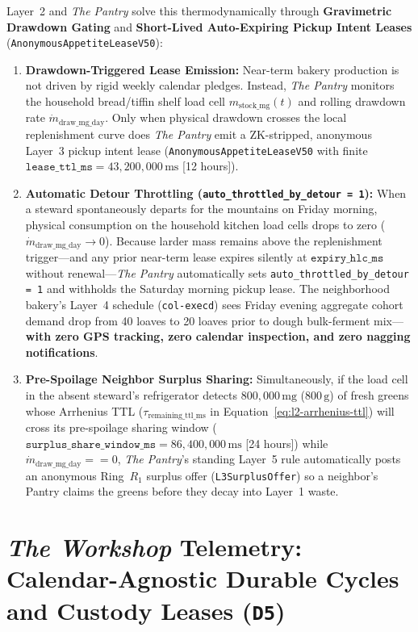 Layer~2 and \textit{The Pantry} solve this thermodynamically through \textbf{Gravimetric Drawdown Gating} and \textbf{Short-Lived Auto-Expiring Pickup Intent Leases} (\texttt{AnonymousAppetiteLeaseV50}):
\begin{enumerate}
    \item \textbf{Drawdown-Triggered Lease Emission:} Near-term bakery production is not driven by rigid weekly calendar pledges. Instead, \textit{The Pantry} monitors the household bread/tiffin shelf load cell $m_{\mathrm{stock\_mg}}(t)$ and rolling drawdown rate $\dot{m}_{\mathrm{draw\_mg\_day}}$. Only when physical drawdown crosses the local replenishment curve does \textit{The Pantry} emit a ZK-stripped, anonymous Layer~3 pickup intent lease (\texttt{AnonymousAppetiteLeaseV50} with finite $\mathtt{lease\_ttl\_ms} = 43{,}200{,}000\,\mathrm{ms}$ [12 hours]).
    \item \textbf{Automatic Detour Throttling (\texttt{auto\_throttled\_by\_detour = 1}):} When a steward spontaneously departs for the mountains on Friday morning, physical consumption on the household kitchen load cells drops to zero ($\dot{m}_{\mathrm{draw\_mg\_day}} \to 0$). Because larder mass remains above the replenishment trigger---and any prior near-term lease expires silently at $\mathtt{expiry\_hlc\_ms}$ without renewal---\textit{The Pantry} automatically sets \texttt{auto\_throttled\_by\_detour = 1} and withholds the Saturday morning pickup lease. The neighborhood bakery's Layer~4 schedule (\texttt{col-execd}) sees Friday evening aggregate cohort demand drop from 40 loaves to 20 loaves prior to dough bulk-ferment mix---\textbf{with zero GPS tracking, zero calendar inspection, and zero nagging notifications}.
    \item \textbf{Pre-Spoilage Neighbor Surplus Sharing:} Simultaneously, if the load cell in the absent steward's refrigerator detects $800{,}000\,\mathrm{mg}$ ($800\,\mathrm{g}$) of fresh greens whose Arrhenius TTL ($\tau_{\mathrm{remaining\_ttl\_ms}}$ in Equation~\eqref{eq:l2-arrhenius-ttl}) will cross its pre-spoilage sharing window ($\mathtt{surplus\_share\_window\_ms} = 86{,}400{,}000\,\mathrm{ms}$ [24 hours]) while $\dot{m}_{\mathrm{draw\_mg\_day}} == 0$, \textit{The Pantry}'s standing Layer~5 rule automatically posts an anonymous Ring~$R_1$ surplus offer (\texttt{L3SurplusOffer}) so a neighbor's Pantry claims the greens before they decay into Layer~1 waste.
\end{enumerate}

\section{\textit{The Workshop} Telemetry: Calendar-Agnostic Durable Cycles and Custody Leases (\texttt{D5})}
\label{sec:l2-workshop-durable-telemetry}


